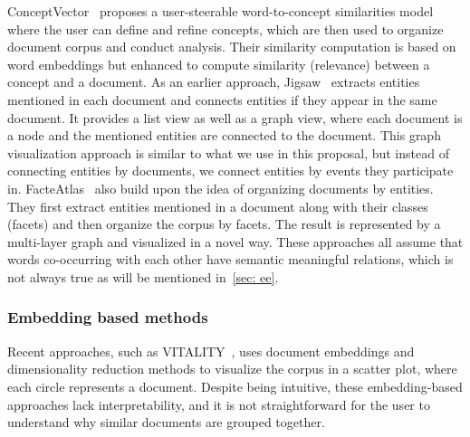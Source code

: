ConceptVector~\cite{park2017conceptvector} proposes a user-steerable word-to-concept similarities model where the user can define and refine concepts, which are then used to organize document corpus and conduct analysis.
Their similarity computation is based on word embeddings but enhanced to compute similarity (relevance) between a concept and a document.
As an earlier approach, Jigsaw~\cite{stasko2007jigsaw} extracts entities mentioned in each document and connects entities if they appear in the same document.
It provides a list view as well as a graph view, where each document is a node and the mentioned entities are connected to the document.
This graph visualization approach is similar to what we use in this proposal, but instead of connecting entities by documents, we connect entities by events they participate in.
FacteAtlas~\cite{cao2010facetatlas} also build upon the idea of organizing documents by entities.
They first extract entities mentioned in a document along with their classes (facets) and then organize the corpus by facets. 
The result is represented by a multi-layer graph and visualized in a novel way.
These approaches all assume that words co-occurring with each other have semantic meaningful relations, which is not always true as will be mentioned in~\autoref{sec: ee}.

\subsubsection{Embedding based methods}
Recent approaches, such as VITALITY~\cite{Narechania2022VITALITY}, uses document embeddings and dimensionality reduction methods to visualize the corpus in a scatter plot, where each circle represents a document.
Despite being intuitive, these embedding-based approaches lack interpretability, and it is not straightforward for the user to understand why similar documents are grouped together.

